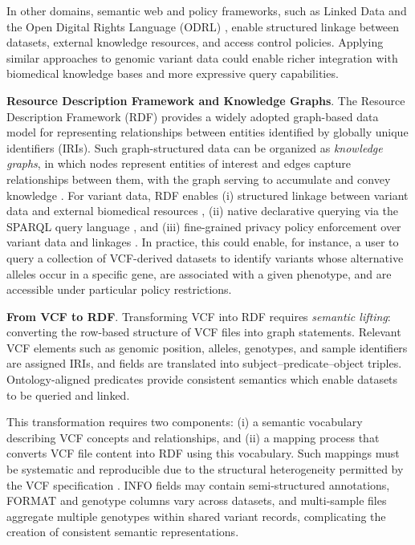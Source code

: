 \documentclass[pdflatex,sn-mathphys-num]{sn-jnl}%
\theoremstyle{thmstyleone}%
\theoremstyle{thmstyletwo}%
\theoremstyle{thmstylethree}%
\begin{document}
In other domains, semantic web and policy frameworks, such as Linked Data \cite{W3CLinkedDataWiki} and the Open Digital Rights Language (ODRL) \cite{odrl_2018}, enable structured linkage between datasets, external knowledge resources, and access control policies. 
Applying similar approaches to genomic variant data could enable richer integration with biomedical knowledge bases and more expressive query capabilities.


\textbf{Resource Description Framework and Knowledge Graphs}.
The Resource Description Framework (RDF) \cite{rdf} provides a widely adopted graph-based data model for representing relationships between entities identified by globally unique identifiers (IRIs).
Such graph-structured data can be organized as \textit{knowledge graphs}, in which nodes represent entities of interest and edges capture relationships between them, with the graph serving to accumulate and convey knowledge \cite{hogan_knowledge_graphs_2021}.
For variant data, RDF enables (i) structured linkage between variant data and external biomedical resources \cite{bio2rdf_2008,openbiolink_2019,sib_2024}, (ii) native declarative querying via the SPARQL query language \cite{sparqllang}, and (iii) fine-grained privacy policy enforcement over variant data and linkages \cite{odrl_2018}.
In practice, this could enable, for instance, a user to query a collection of VCF-derived datasets to identify variants whose alternative alleles occur in a specific gene, are associated with a given phenotype, and are accessible under particular policy restrictions.


\textbf{From VCF to RDF}.
Transforming VCF into RDF requires \textit{semantic lifting}: converting the row-based structure of VCF files into graph statements. 
Relevant VCF elements such as genomic position, alleles, genotypes, and sample identifiers are assigned IRIs, and fields are translated into subject–predicate–object triples. 
Ontology-aligned predicates provide consistent semantics which enable datasets to be queried and linked.

This transformation requires two components: 
(i) a semantic vocabulary describing VCF concepts and relationships, and 
(ii) a mapping process that converts VCF file content into RDF using this vocabulary. 
Such mappings must be systematic and reproducible due to the structural heterogeneity permitted by the VCF specification \cite{vcf_spec_2024}. 
INFO fields may contain semi-structured annotations, FORMAT and genotype columns vary across datasets, and multi-sample files aggregate multiple genotypes within shared variant records, complicating the creation of consistent semantic representations.
\end{document}
